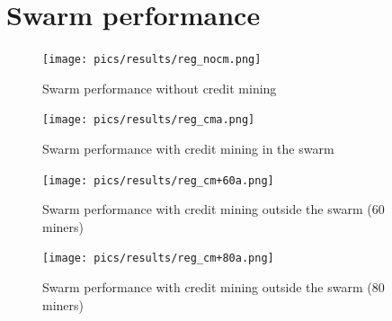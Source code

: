 \clearpage
\section{Swarm performance}
\begin{figure}[h]
	\centering
	\texttt{[image: pics/results/reg\_nocm.png]}
	\caption{Swarm performance without credit mining}
	\label{fig:swarmnocmperf}
\end{figure}

\begin{figure}[h]
	\centering
	\texttt{[image: pics/results/reg\_cma.png]}
	\caption{Swarm performance with credit mining in the swarm}
	\label{fig:swarmcmperf}
\end{figure}

\begin{figure}[h]
	\centering
	\texttt{[image: pics/results/reg\_cm+60a.png]}
	\caption{Swarm performance with credit mining outside the swarm (60 miners)}
	\label{fig:swarmcm60perf}
\end{figure}

\begin{figure}[h]
	\centering
	\texttt{[image: pics/results/reg\_cm+80a.png]}
	\caption{Swarm performance with credit mining outside the swarm (80 miners)}
	\label{fig:swarmcm80perf}
\end{figure}


\clearpage
